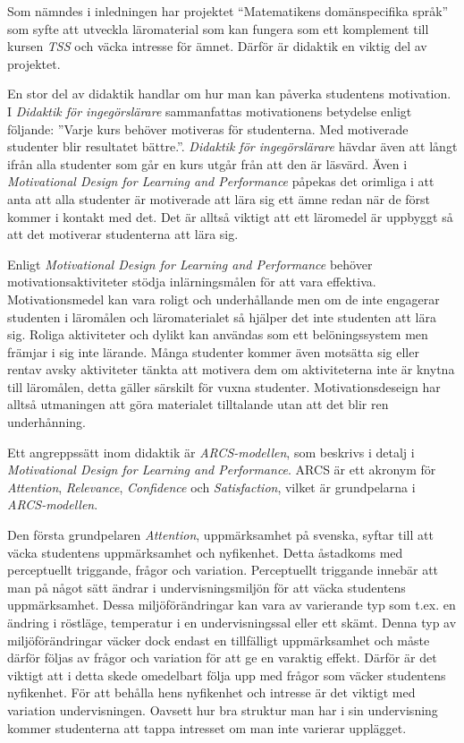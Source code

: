 \documentclass[]{article}
\begin{document}
Som nämndes i inledningen har projektet “Matematikens domänspecifika språk”
som syfte att utveckla läromaterial som kan fungera som ett komplement till
kursen \textit{TSS} och väcka intresse för ämnet.
Därför är didaktik en viktig del av projektet.

En stor del av didaktik handlar om hur man kan påverka studentens motivation.
I \textit{Didaktik för ingegörslärare} sammanfattas motivationens betydelse
enligt följande: ”Varje kurs behöver motiveras för studenterna.
Med motiverade studenter blir resultatet bättre.”.
\textit{Didaktik för ingegörslärare} hävdar även att långt ifrån alla studenter
som går en kurs utgår från att den är läsvärd.
Även i \textit{Motivational Design for Learning and Performance} påpekas det
orimliga i att anta att alla studenter är motiverade att lära sig ett ämne
redan när de först kommer i kontakt med det.
Det är alltså viktigt att ett läromedel är uppbyggt så att det motiverar
studenterna att lära sig.

Enligt \textit{Motivational Design for Learning and Performance} behöver
motivationsaktiviteter stödja inlärningsmålen för att vara effektiva.
Motivationsmedel kan vara roligt och underhållande men om de inte engagerar
studenten i läromålen och läromaterialet så hjälper det inte studenten att
lära sig. Roliga aktiviteter och dylikt kan användas som ett belöningssystem
men främjar i sig inte lärande. Många studenter kommer även motsätta sig
eller rentav avsky aktiviteter tänkta att motivera dem om aktiviteterna
inte är knytna till läromålen, detta gäller särskilt för vuxna studenter.
Motivationsdeseign har alltså utmaningen att göra materialet tilltalande
utan att det blir ren underhånning.

Ett angreppssätt inom didaktik är \textit{ARCS-modellen},
som beskrivs i detalj i
\textit{Motivational Design for Learning and Performance}.
ARCS är ett akronym för \textit{Attention}, \textit{Relevance},
\textit{Confidence} och \textit{Satisfaction}, vilket är grundpelarna
i \textit{ARCS-modellen}.

Den första grundpelaren \textit{Attention}, uppmärksamhet på svenska,
syftar till att väcka studentens uppmärksamhet och nyfikenhet.
Detta åstadkoms med perceptuellt triggande, frågor och variation.
Perceptuellt triggande innebär att man på något sätt ändrar i
undervisningsmiljön för att väcka studentens uppmärksamhet.
Dessa miljöförändringar kan vara av varierande typ som t.ex. en ändring i
röstläge, temperatur i en undervisningssal eller ett skämt.
Denna typ av miljöförändringar väcker dock endast en tillfälligt uppmärksamhet
och måste därför följas av frågor och variation för att ge en varaktig effekt.
Därför är det viktigt att i detta skede omedelbart följa upp med frågor som väcker
studentens nyfikenhet. För att behålla hens nyfikenhet och
intresse är det viktigt med variation undervisningen.
Oavsett hur bra struktur man har i sin undervisning kommer studenterna att tappa
intresset om man inte varierar upplägget.
\end{document}
